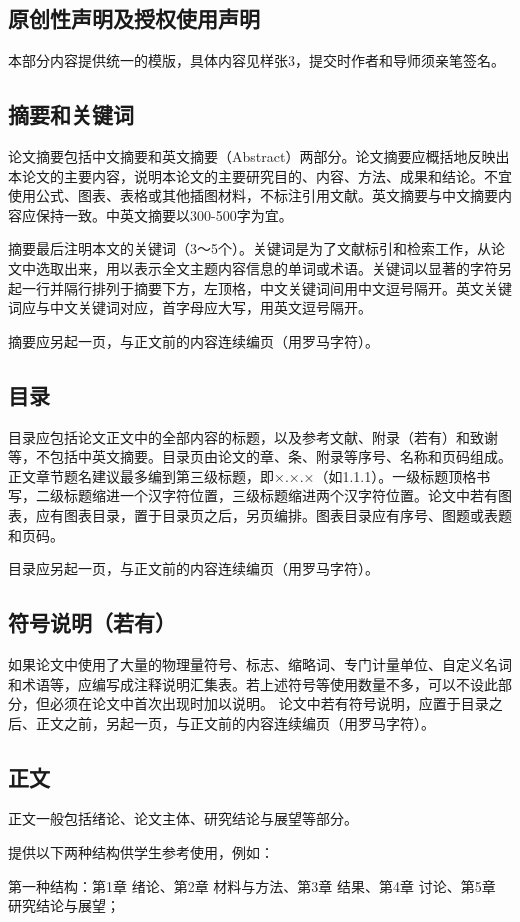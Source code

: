{\subsection{原创性声明及授权使用声明}
本部分内容提供统一的模版，具体内容见样张3，提交时作者和导师须亲笔签名。
\subsection{摘要和关键词}
论文摘要包括中文摘要和英文摘要（Abstract）两部分。论文摘要应概括地反映出本论文的主要内容，说明本论文的主要研究目的、内容、方法、成果和结论。不宜使用公式、图表、表格或其他插图材料，不标注引用文献。英文摘要与中文摘要内容应保持一致。中英文摘要以300-500字为宜。

摘要最后注明本文的关键词（3～5个）。关键词是为了文献标引和检索工作，从论文中选取出来，用以表示全文主题内容信息的单词或术语。关键词以显著的字符另起一行并隔行排列于摘要下方，左顶格，中文关键词间用中文逗号隔开。英文关键词应与中文关键词对应，首字母应大写，用英文逗号隔开。

摘要应另起一页，与正文前的内容连续编页（用罗马字符）。
\subsection{目录}
目录应包括论文正文中的全部内容的标题，以及参考文献、附录（若有）和致谢等，不包括中英文摘要。目录页由论文的章、条、附录等序号、名称和页码组成。正文章节题名建议最多编到第三级标题，即×.×.×（如1.1.1）。一级标题顶格书写，二级标题缩进一个汉字符位置，三级标题缩进两个汉字符位置。论文中若有图表，应有图表目录，置于目录页之后，另页编排。图表目录应有序号、图题或表题和页码。

目录应另起一页，与正文前的内容连续编页（用罗马字符）。
\subsection{符号说明（若有）}
如果论文中使用了大量的物理量符号、标志、缩略词、专门计量单位、自定义名词和术语等，应编写成注释说明汇集表。若上述符号等使用数量不多，可以不设此部分，但必须在论文中首次出现时加以说明。
论文中若有符号说明，应置于目录之后、正文之前，另起一页，与正文前的内容连续编页（用罗马字符）。
\subsection{正文}
正文一般包括绪论、论文主体、研究结论与展望等部分。

提供以下两种结构供学生参考使用，例如：

第一种结构：第1章 绪论、第2章 材料与方法、第3章 结果、第4章 讨论、第5章 研究结论与展望；

}
